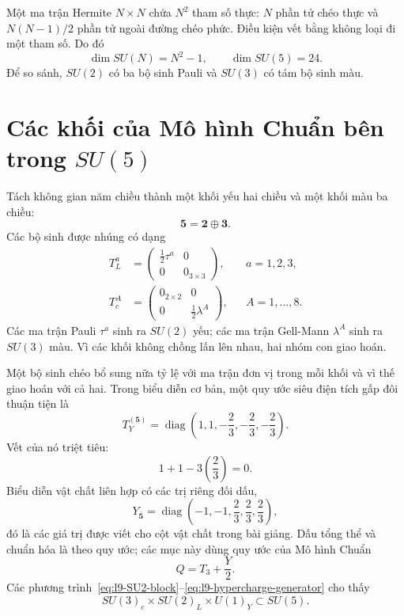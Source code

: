 Một ma trận Hermite \(N\times N\) chứa \(N^2\) tham số thực: \(N\) phần tử chéo thực và \(N(N-1)/2\) phần tử ngoài đường chéo phức. Điều kiện vết bằng không loại đi một tham số. Do đó
\begin{equation}
\dim SU(N)=N^2-1,
\qquad
\dim SU(5)=24.
\label{eq:l9-SU5-dimension}
\end{equation}
Để so sánh, \(SU(2)\) có ba bộ sinh Pauli và \(SU(3)\) có tám bộ sinh màu.

\section{Các khối của Mô hình Chuẩn bên trong \texorpdfstring{\(SU(5)\)}{SU(5)}}

Tách không gian năm chiều thành một khối yếu hai chiều và một khối màu ba chiều:
\begin{equation}
\mathbf5=\mathbf2\oplus\mathbf3.
\end{equation}
Các bộ sinh được nhúng có dạng
\begin{align}
T^a_L
&=
\begin{pmatrix}
\tfrac12\tau^a&0\\
0&0_{3\times3}
\end{pmatrix},
&& a=1,2,3,
\label{eq:l9-SU2-block}\\
T^A_c
&=
\begin{pmatrix}
0_{2\times2}&0\\
0&\tfrac12\lambda^A
\end{pmatrix},
&& A=1,\ldots,8.
\label{eq:l9-SU3-block}
\end{align}
Các ma trận Pauli \(\tau^a\) sinh ra \(SU(2)\) yếu; các ma trận Gell-Mann \(\lambda^A\) sinh ra \(SU(3)\) màu. Vì các khối không chồng lấn lên nhau, hai nhóm con giao hoán.

Một bộ sinh chéo bổ sung nữa tỷ lệ với ma trận đơn vị trong mỗi khối và vì thế giao hoán với cả hai. Trong biểu diễn cơ bản, một quy ước siêu điện tích gấp đôi thuận tiện là
\begin{equation}
T_Y^{(\mathbf5)}=
\operatorname{diag}
\left(
1,1,-\frac23,-\frac23,-\frac23
\right).
\label{eq:l9-hypercharge-generator}
\end{equation}
Vết của nó triệt tiêu:
\begin{equation}
1+1-3\left(\frac23\right)=0.
\end{equation}
Biểu diễn vật chất liên hợp có các trị riêng đối dấu,
\begin{equation}
Y_{\overline{\mathbf5}}
=
\operatorname{diag}
\left(
-1,-1,\frac23,\frac23,\frac23
\right),
\label{eq:l9-fivebar-hypercharge}
\end{equation}
đó là các giá trị được viết cho cột vật chất trong bài giảng. Dấu tổng thể và chuẩn hóa là theo quy ước; các mục này dùng quy ước của Mô hình Chuẩn
\begin{equation}
Q=T_3+\frac{Y}{2}.
\label{eq:l9-charge}
\end{equation}
Các phương trình~\eqref{eq:l9-SU2-block}--\eqref{eq:l9-hypercharge-generator} cho thấy
\begin{equation}
SU(3)_c\times SU(2)_L\times U(1)_Y
\subset SU(5).
\end{equation}

